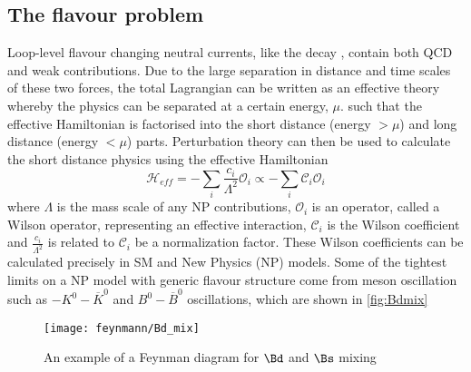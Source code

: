 \subsection{The flavour problem}
\label{subsec:mfv}
Loop-level flavour changing neutral currents, like the decay \Lbpi, contain both QCD and weak contributions. Due to the large separation in distance and time scales of these two forces, the total Lagrangian can be written as an effective theory whereby the physics can be separated at a certain energy, $\mu$. such that the effective Hamiltonian is factorised into the short distance (energy $>\mu$) and long distance (energy $<\mu$) parts. Perturbation theory can then be used to calculate the short distance physics using the effective Hamiltonian
\begin{equation}
  \mathcal{H}_{eff} = -\sum_{i}\frac{c_{i}}{\Lambda^{2}}\mathcal{O}_{i} \propto -\sum_{i}\mathcal{C}_{i}\mathcal{O}_{i}
\end{equation}
where $\Lambda$ is the mass scale of any NP contributions, $\mathcal{O}_{i}$ is an operator, called a Wilson operator, representing an effective interaction, $\mathcal{C}_{i}$ is the Wilson coefficient and $\frac{c_{i}}{\Lambda^{2}}$ is related to $\mathcal{C}_{i}$ be a normalization factor.
These Wilson coefficients can be calculated precisely in SM and New Physics (NP) models. Some of the tightest limits on a NP model with generic flavour structure come from meson oscillation such as $-K^{0} - \overline{K}^{0}$ and $B^{0} - \overline{B}^{0}$ oscillations, which are shown in \autoref{fig:Bdmix}
\begin{figure}[!h]\def\nh{0.5\textwidth}
  \centering
  \texttt{[image: feynmann/Bd\_mix]}
  \caption{An example of a Feynman diagram for $\Bd$ and $\Bs$ mixing}
  \label{fig:Bdmix}
\end{figure}

